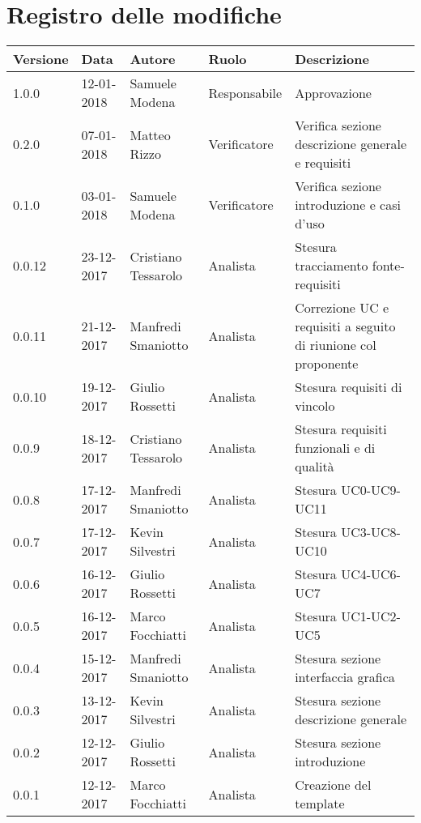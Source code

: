 \documentclass[./AnalisideiRequisiti.tex]{subfiles}
\begin{document}
	
\chapter*{Registro delle modifiche}
\begin{center}	
	\begin{tabular}{|l|l|l|l|p{4cm}|}
		\hline
		\textbf{Versione} & \textbf{Data} & \textbf{Autore} & \textbf{Ruolo} & \textbf{Descrizione} \\ \hline \hline	
		
		1.0.0 & 12-01-2018 & Samuele Modena & Responsabile & Approvazione\\ \hline
		0.2.0 & 07-01-2018 & Matteo Rizzo & Verificatore & Verifica sezione descrizione generale e requisiti\\ \hline
		0.1.0 & 03-01-2018 & Samuele Modena & Verificatore & Verifica sezione introduzione e casi d’uso\\ \hline		
		0.0.12 & 23-12-2017 & Cristiano Tessarolo & Analista & Stesura tracciamento fonte-requisiti\\ \hline
		0.0.11 & 21-12-2017 & Manfredi Smaniotto & Analista & Correzione UC e requisiti a seguito di riunione col proponente\\ \hline
		0.0.10 & 19-12-2017 & Giulio Rossetti & Analista & Stesura requisiti di
		vincolo\\ \hline
		0.0.9 & 18-12-2017 & Cristiano Tessarolo & Analista & Stesura requisiti funzionali e di qualità\\ \hline
		0.0.8 & 17-12-2017 & Manfredi Smaniotto & Analista & Stesura UC0-UC9-UC11\\ \hline
		0.0.7 & 17-12-2017 & Kevin Silvestri & Analista & Stesura UC3-UC8-UC10\\ \hline
		0.0.6 & 16-12-2017 & Giulio Rossetti & Analista & Stesura UC4-UC6-UC7\\ \hline
		0.0.5 & 16-12-2017 & Marco Focchiatti & Analista & Stesura UC1-UC2-UC5\\ \hline
		0.0.4 & 15-12-2017 & Manfredi Smaniotto & Analista & Stesura sezione interfaccia grafica\\ \hline
		0.0.3 & 13-12-2017 & Kevin Silvestri & Analista & Stesura sezione descrizione generale\\ \hline
		0.0.2 & 12-12-2017 & Giulio Rossetti & Analista & Stesura sezione introduzione\\ \hline
		0.0.1 & 12-12-2017 & Marco Focchiatti & Analista & Creazione del template\\ \hline
	\end{tabular}
\end{center}	
\end{document}
